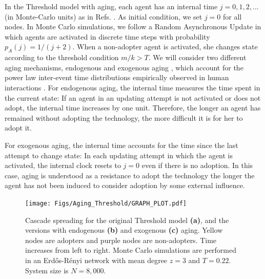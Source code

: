 In the Threshold model with aging, each agent has an internal time $j = 0,1,2,...$  (in Monte-Carlo units) as in Refs. \cite{fernandez-gracia-2013,artime-2018,peralta-2020C,peralta-2020A,chen-2020,fernandez-gracia-2011,perez-2016,stark-2008}.  As initial condition, we set $j = 0$ for all nodes. In Monte Carlo simulations, we follow a Random Asynchronous Update in which agents are activated in discrete time steps with probability $p_{A} (j) = 1/(j+2)$. When a non-adopter agent is activated, she changes state according to the threshold condition $m/k > T$. We will consider two different aging mechanisms, endogenous and exogenous aging \cite{fernandez-gracia-2011}, which account for the power law inter-event time distributions empirically observed in human interactions \cite{artime-2017}. For endogenous aging,  the internal time measures the time spent in the current state: If an agent in an updating attempt is not activated or does not adopt, the internal time increases by one unit. Therefore, the longer an agent has remained without adopting the technology, the more difficult it is for her to adopt it. 

For exogenous aging, the internal time accounts for the time since the last attempt to change state: In each updating attempt in which the agent is activated, the internal clock resets to $j = 0$ even if there is no adoption. In this case, aging is understood as a resistance to adopt the technology the longer the agent has not been induced to consider adoption by some external influence.  


\begin{figure}[bh!]
    \centering \captionsetup{font=sf}
    \texttt{[image: Figs/Aging\_Threshold/GRAPH\_PLOT.pdf]}
    \caption[Cascade spreading for the Threshold model]{\label{fig:graph_plot} Cascade spreading for the original Threshold model \textbf{(a)}, and the versions with endogenous \textbf{(b)} and exogenous \textbf{(c)} aging. Yellow nodes are adopters and purple nodes are non-adopters. Time increases from left to right. Monte Carlo simulations are performed in an Erd\H{o}s-R\'enyi network with mean degree $z = 3$ and $T = 0.22$. System size is $N = 8,000$.}
    \end{figure}

